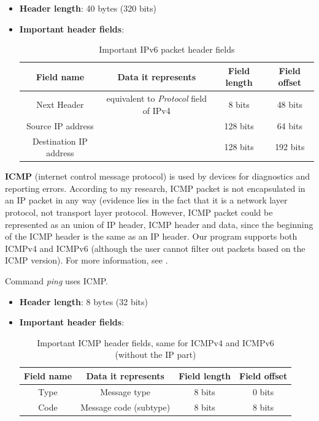 \documentclass[a4paper]{article}
\begin{document}
  \begin{itemize}
    \item \textbf{Header length}: 40 bytes (320 bits)
    \item \textbf{Important header fields}:
      \begin{table}[h]
        \centering
        \begin{tabular}{|c|c|c|c|}
          \hline
          Field name & Data it represents & Field length & Field offset \\
          \hline
          \hline
          Next Header & equivalent to \textit{Protocol} field of IPv4 & 8 bits & 48 bits \\
          \hline
          Source IP address & & 128 bits & 64 bits \\
          \hline
          Destination IP address & & 128 bits & 192 bits \\
          \hline
        \end{tabular}
        \caption{Important IPv6 packet header fields}
      \end{table}
  \end{itemize}

  \vspace{1cm}


  \textbf{ICMP} (internet control message protocol) is used by devices for
  diagnostics and reporting errors. According to my research, ICMP packet is 
  not encapsulated in an IP packet in any way (evidence lies in the fact that 
  it is a network layer protocol, not transport layer protocol. However, ICMP 
  packet could be represented as an union of IP header, ICMP header and data, 
  since the beginning of the ICMP header is the same as an IP header. Our
  program supports both ICMPv4 and ICMPv6 (although the user cannot filter
  out packets based on the ICMP version).
  For more information, see \cite{wikipedia:icmp}.

  \begin{notes}
    \item Command \textit{ping} uses ICMP.
  \end{notes}

  \begin{itemize}
    \item \textbf{Header length}: 8 bytes (32 bits)
    \item \textbf{Important header fields}:
      \begin{table}[h]
        \centering
        \begin{tabular}{|c|c|c|c|}
          \hline
          Field name & Data it represents & Field length & Field offset \\
          \hline
          \hline
          Type & Message type & 8 bits & 0 bits \\
          \hline
          Code & Message code (subtype) & 8 bits & 8 bits \\
          \hline
        \end{tabular}
        \caption{Important ICMP header fields, same for ICMPv4 and ICMPv6 
          (without the IP part)}
      \end{table}
  \end{itemize}
\end{document}
